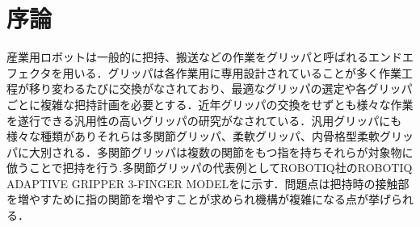 \section{序論}
\label{sec:序論}
産業用ロボットは一般的に把持、搬送などの作業をグリッパと呼ばれるエンドエフェクタを用いる．グリッパは各作業用に専用設計されていることが多く作業工程が移り変わるたびに交換がなされており、最適なグリッパの選定や各グリッパごとに複雑な把持計画を必要とする．近年グリッパの交換をせずとも様々な作業を遂行できる汎用性の高いグリッパの研究がなされている．汎用グリッパにも様々な種類がありそれらは多関節グリッパ、柔軟グリッパ、内骨格型柔軟グリッパに大別される．多関節グリッパは複数の関節をもつ指を持ちそれらが対象物に倣うことで把持を行う\cite{takansetsu}.多関節グリッパの代表例としてROBOTIQ社のROBOTIQ ADAPTIVE GRIPPER 3-FINGER MODELをに示す．問題点は把持時の接触部を増やすために指の関節を増やすことが求められ機構が複雑になる点が挙げられる．


